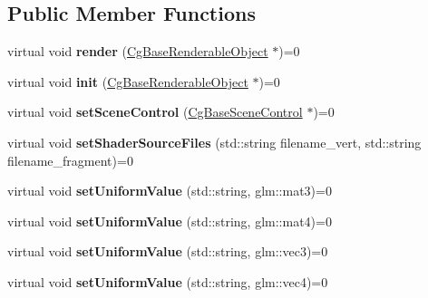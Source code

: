 \subsection*{Public Member Functions}
\begin{DoxyCompactItemize}
\item 
\mbox{\label{class_cg_base_renderer_a3be215eddc6b78497ae3ca637fdc4d44}} 
virtual void {\bfseries render} (\hyperlink{class_cg_base_renderable_object}{Cg\+Base\+Renderable\+Object} $\ast$)=0
\item 
\mbox{\label{class_cg_base_renderer_a2e29d59dd7d504215c6fb12100438fe1}} 
virtual void {\bfseries init} (\hyperlink{class_cg_base_renderable_object}{Cg\+Base\+Renderable\+Object} $\ast$)=0
\item 
\mbox{\label{class_cg_base_renderer_a71fd71d613f70fc09fb9c6b450a01863}} 
virtual void {\bfseries set\+Scene\+Control} (\hyperlink{class_cg_base_scene_control}{Cg\+Base\+Scene\+Control} $\ast$)=0
\item 
\mbox{\label{class_cg_base_renderer_a47da09dda3d92d902250febd9029d608}} 
virtual void {\bfseries set\+Shader\+Source\+Files} (std\+::string filename\+\_\+vert, std\+::string filename\+\_\+fragment)=0
\item 
\mbox{\label{class_cg_base_renderer_ac38d563a5a188c2d0d35787115faefc7}} 
virtual void {\bfseries set\+Uniform\+Value} (std\+::string, glm\+::mat3)=0
\item 
\mbox{\label{class_cg_base_renderer_a691c9a9cc53a33977b33ee2c974c4060}} 
virtual void {\bfseries set\+Uniform\+Value} (std\+::string, glm\+::mat4)=0
\item 
\mbox{\label{class_cg_base_renderer_a4182e5458c01a49b7e2b1cfec5900da3}} 
virtual void {\bfseries set\+Uniform\+Value} (std\+::string, glm\+::vec3)=0
\item 
\mbox{\label{class_cg_base_renderer_aaa70878090b5a68c54728065af5d4934}} 
virtual void {\bfseries set\+Uniform\+Value} (std\+::string, glm\+::vec4)=0
\item 

\end{DoxyCompactItemize}

